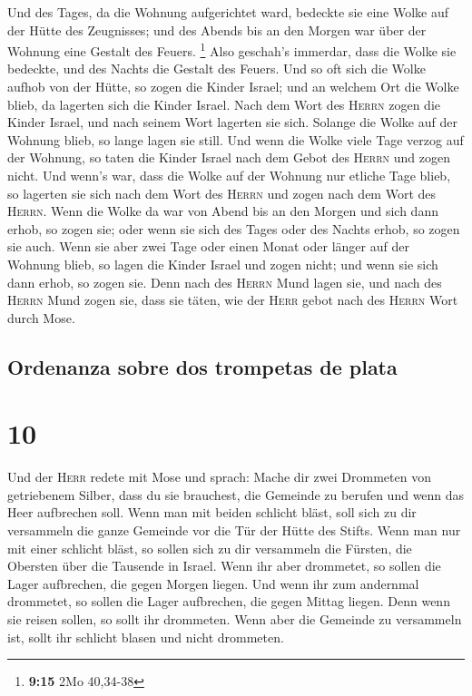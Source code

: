  Und des Tages, da die Wohnung aufgerichtet ward,
bedeckte sie eine Wolke auf der Hütte des Zeugnisses; und des Abends bis
an den Morgen war über der Wohnung eine Gestalt des Feuers. \footnote{\textbf{9:15}
  2Mo 40,34-38}  Also geschah's immerdar, dass die Wolke
sie bedeckte, und des Nachts die Gestalt des Feuers.  Und
so oft sich die Wolke aufhob von der Hütte, so zogen die Kinder Israel;
und an welchem Ort die Wolke blieb, da lagerten sich die Kinder Israel.
 Nach dem Wort des \textsc{Herrn} zogen die Kinder
Israel, und nach seinem Wort lagerten sie sich. Solange die Wolke auf
der Wohnung blieb, so lange lagen sie still.  Und wenn
die Wolke viele Tage verzog auf der Wohnung, so taten die Kinder Israel
nach dem Gebot des \textsc{Herrn} und zogen nicht.  Und
wenn's war, dass die Wolke auf der Wohnung nur etliche Tage blieb, so
lagerten sie sich nach dem Wort des \textsc{Herrn} und zogen nach dem
Wort des \textsc{Herrn}.  Wenn die Wolke da war von Abend
bis an den Morgen und sich dann erhob, so zogen sie; oder wenn sie sich
des Tages oder des Nachts erhob, so zogen sie auch.  Wenn
sie aber zwei Tage oder einen Monat oder länger auf der Wohnung blieb,
so lagen die Kinder Israel und zogen nicht; und wenn sie sich dann
erhob, so zogen sie.  Denn nach des \textsc{Herrn} Mund
lagen sie, und nach des \textsc{Herrn} Mund zogen sie, dass sie täten,
wie der \textsc{Herr} gebot nach des \textsc{Herrn} Wort durch Mose.

\hypertarget{ordenanza-sobre-dos-trompetas-de-plata}{%
\subsection{Ordenanza sobre dos trompetas de
plata}\label{ordenanza-sobre-dos-trompetas-de-plata}}

\hypertarget{section-9}{%
\section{10}\label{section-9}}

 Und der \textsc{Herr} redete mit Mose und sprach:
 Mache dir zwei Drommeten von getriebenem Silber, dass du
sie brauchest, die Gemeinde zu berufen und wenn das Heer aufbrechen
soll.  Wenn man mit beiden schlicht bläst, soll sich zu
dir versammeln die ganze Gemeinde vor die Tür der Hütte des Stifts.
 Wenn man nur mit einer schlicht bläst, so sollen sich zu
dir versammeln die Fürsten, die Obersten über die Tausende in Israel.
 Wenn ihr aber drommetet, so sollen die Lager aufbrechen,
die gegen Morgen liegen.  Und wenn ihr zum andernmal
drommetet, so sollen die Lager aufbrechen, die gegen Mittag liegen. Denn
wenn sie reisen sollen, so sollt ihr drommeten.  Wenn aber
die Gemeinde zu versammeln ist, sollt ihr schlicht blasen und nicht
drommeten.

